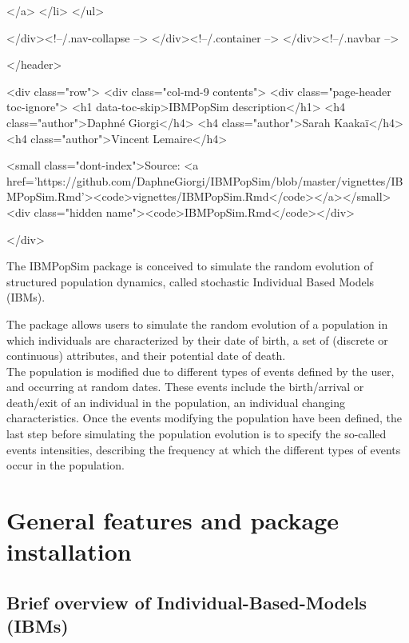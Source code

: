   </a>
</li>
      </ul>
      
    </div><!--/.nav-collapse -->
  </div><!--/.container -->
</div><!--/.navbar -->

      

      </header>


<div class="row">
  <div class="col-md-9 contents">
    <div class="page-header toc-ignore">
      <h1 data-toc-skip>IBMPopSim description</h1>
                        <h4 class="author">Daphné Giorgi</h4>
                        <h4 class="author">Sarah Kaakaï</h4>
                        <h4 class="author">Vincent Lemaire</h4>
            
      
      <small class="dont-index">Source: <a href='https://github.com/DaphneGiorgi/IBMPopSim/blob/master/vignettes/IBMPopSim.Rmd'><code>vignettes/IBMPopSim.Rmd</code></a></small>
      <div class="hidden name"><code>IBMPopSim.Rmd</code></div>

    </div>

    
    
The IBMPopSim package is conceived to simulate the random evolution of structured population dynamics, called stochastic Individual Based Models (IBMs).

The package allows users to simulate the random evolution of a population in which individuals are characterized by their date of birth, a set of (discrete or continuous) attributes, and their potential date of death.\\
The population is modified due to different types of events defined by the user, and occurring at random dates. These events include the birth/arrival or death/exit of an individual in the population, an individual changing characteristics.
Once the events modifying the population have been defined, the last step before simulating the population evolution is to specify the so-called events intensities, describing the frequency at which the different types of events occur in the population.

\hypertarget{general-features-and-package-installation}{%
\section{General features and package installation}\label{general-features-and-package-installation}}

\hypertarget{brief-overview-of-individual-based-models-ibms}{%
\subsection{Brief overview of Individual-Based-Models (IBMs)}\label{brief-overview-of-individual-based-models-ibms}}

